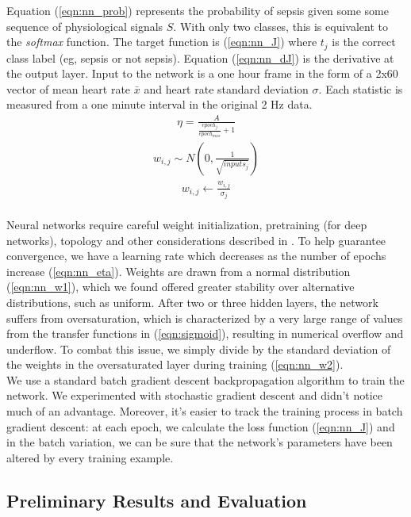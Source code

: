 \documentclass[12pt,solutions]{article}
\begin{document}
Equation (\ref{eqn:nn_prob}) represents the probability
of sepsis given some some sequence of physiological signals $S$. With only two classes, this is equivalent to the
\textit{softmax} function. The 
target function is (\ref{eqn:nn_J}) where $t_{j}$ is the correct class label (eg, sepsis or not sepsis). Equation (\ref{eqn:nn_dJ})
is the derivative at the output layer. Input to the network is a one hour frame in the form of a 2x60 vector of mean heart rate $\bar{x}$
and heart rate standard deviation $\sigma$. Each statistic is measured from a one minute interval in the original 2 Hz data.
\begin{align}
\eta = \frac{A}{\frac{epoch_{j}}{epoch_{max}} + 1}
\label{eqn:nn_eta}
\end{align}
\begin{align}
w_{i,j} \sim N(0, \frac{1}{\sqrt{inputs_{j}}})
\label{eqn:nn_w1}
\end{align}
\begin{align}
w_{i,j} \leftarrow \frac{w_{i,j}}{\sigma_{j}}
\label{eqn:nn_w2}
\end{align}
\\
Neural networks require careful weight initialization, pretraining (for deep networks), topology and other considerations 
described in \cite{vesely2013sequence, hinton2012deep}. To help guarantee convergence, we have a learning rate which decreases as the 
number of epochs increase (\ref{eqn:nn_eta}). Weights are drawn from a normal distribution (\ref{eqn:nn_w1}), which we found offered greater stability over alternative distributions, such as uniform. After two or three hidden layers, the network suffers from oversaturation, which is characterized by a very large range of values from the
transfer functions in (\ref{eqn:sigmoid}), resulting in numerical overflow and underflow. To combat this issue, we simply divide by the standard deviation
of the weights in the oversaturated layer during training (\ref{eqn:nn_w2}).
\\
We use a standard batch gradient descent backpropagation algorithm to train the network. We experimented with stochastic gradient descent and didn't
notice much of an advantage. Moreover, it's easier to track the training process in batch gradient descent: at each epoch, we calculate
the loss function (\ref{eqn:nn_J}) and in the batch variation, we can be sure that the network's parameters have been altered by every training example.

\subsection{Preliminary Results and Evaluation}
\end{document}
